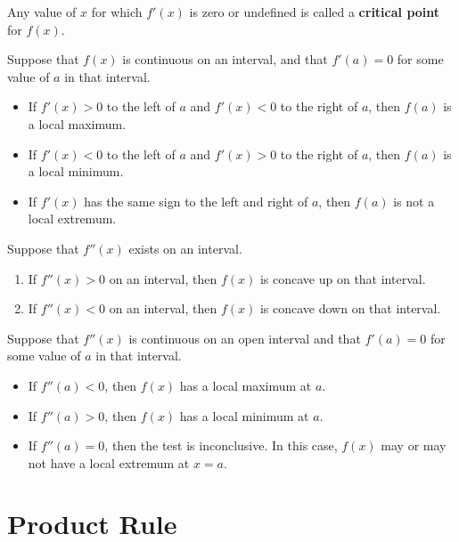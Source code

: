\documentclass{ximera}
\begin{document}
\begin{definition}
Any value of $x$ for which $f'(x)$ is zero or undefined is called a
\textbf{critical point} for $f(x)$.
\end{definition}



\begin{theorem}\label{T:fdt}\hfil
Suppose that $f(x)$ is continuous on an interval, and that $f'(a)=0$
for some value of $a$ in that interval.
\begin{itemize}
\item If $f'(x)>0$ to the left of $a$ and $f'(x)<0$ to the right of
  $a$, then $f(a)$ is a local maximum.
\item If $f'(x)<0$ to the left of $a$ and $f'(x)>0$ to the right of
  $a$, then $f(a)$ is a local minimum.
\item If $f'(x)$ has the same sign to the left and right of $a$,
  then $f(a)$ is not a local extremum.
\end{itemize}
\end{theorem}


\begin{theorem}
Suppose that $f''(x)$ exists on an interval.
\begin{enumerate}
\item If $f''(x)>0$ on an interval, then $f(x)$ is concave up on that interval.
\item If $f''(x)<0$ on an interval, then $f(x)$ is concave down on that interval.
\end{enumerate}
\end{theorem}


\begin{theorem}\label{T:sdt}
Suppose that $f''(x)$ is continuous on an open interval and that
$f'(a)=0$ for some value of $a$ in that interval.
\begin{itemize}
\item If $f''(a) <0$, then $f(x)$ has a local maximum at $a$.
\item If $f''(a) >0$, then $f(x)$ has a local minimum at $a$.
\item If $f''(a) =0$, then the test is inconclusive. In this case,
  $f(x)$ may or may not have a local extremum at $x=a$.
\end{itemize}
\end{theorem}



\section*{Product Rule}
\end{document}
